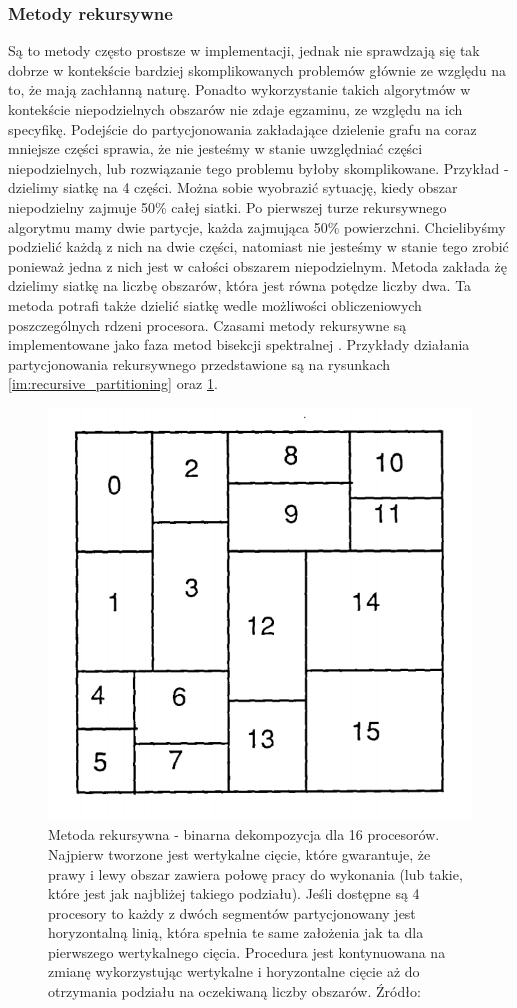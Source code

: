 \subsubsection{Metody rekursywne}

Są to metody często prostsze w implementacji, jednak nie sprawdzają się tak dobrze w kontekście bardziej
skomplikowanych problemów głównie ze względu na to, że mają zachłanną naturę.
Ponadto wykorzystanie takich algorytmów w kontekście niepodzielnych obszarów nie zdaje egzaminu,
ze względu na ich specyfikę. Podejście do partycjonowania zakładające dzielenie grafu na coraz mniejsze
części sprawia, że nie jesteśmy w stanie uwzględniać części niepodzielnych, lub rozwiązanie tego problemu byłoby skomplikowane.
Przykład - dzielimy siatkę na 4 części. Można sobie wyobrazić sytuację, kiedy obszar niepodzielny zajmuje 50\% całej siatki.
Po pierwszej turze rekursywnego algorytmu mamy dwie partycje, każda zajmująca 50\% powierzchni. Chcielibyśmy podzielić
każdą z nich na dwie części, natomiast nie jesteśmy w stanie tego zrobić ponieważ jedna z nich jest w całości obszarem
niepodzielnym.
Metoda \cite{recursive} zakłada żę dzielimy siatkę na liczbę obszarów,
która jest równa potędze liczby dwa. Ta metoda potrafi także dzielić siatkę wedle możliwości obliczeniowych
poszczególnych rdzeni procesora. Czasami metody rekursywne są implementowane jako faza metod
bisekcji spektralnej \cite{10.1137/0611030}. Przykłady działania partycjonowania rekursywnego przedstawione są na rysunkach
\ref{im:recursive_partitioning} oraz \ref{im:rec_partitioning}.


\begin{figure}[h]
    \centering
    \includegraphics[width=0.5\linewidth]{images/recursive-part}
    \caption{Metoda rekursywna - binarna dekompozycja dla 16 procesorów. Najpierw tworzone jest wertykalne cięcie,
        które gwarantuje, że prawy i lewy obszar
    zawiera połowę pracy do wykonania (lub takie, które jest jak najbliżej takiego podziału). Jeśli dostępne
    są 4 procesory to każdy z dwóch segmentów partycjonowany jest horyzontalną linią, która spełnia te same założenia
    jak ta dla pierwszego wertykalnego cięcia. Procedura jest kontynuowana na zmianę wykorzystując wertykalne i
    horyzontalne cięcie aż do otrzymania podziału na oczekiwaną liczby obszarów. Źródło: \cite{recursive}}
    \label{im:rec_partitioning}
\end{figure}

